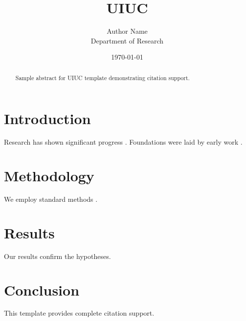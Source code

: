 \documentclass{thesis_illinois}
\title{UIUC}
\author{Author Name \\ \small Department of Research}
\date{\today}
\begin{document}
\maketitle

\begin{abstract}
Sample abstract for UIUC template demonstrating citation support.
\end{abstract}

\section{Introduction}
Research has shown significant progress \citep{einstein1905}. Foundations were laid by early work \citep{turing1950}.

\section{Methodology}
We employ standard methods \citep{knuth1984}.

\section{Results}
Our results confirm the hypotheses.

\section{Conclusion}
This template provides complete citation support.



\end{document}
